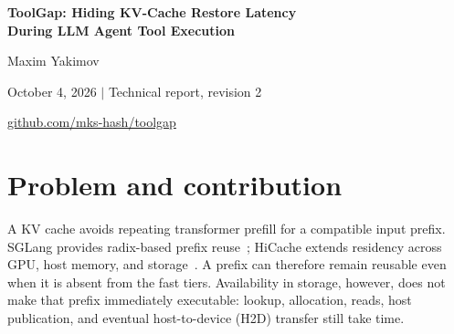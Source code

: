 \documentclass[10pt,a4paper]{article}
\newcommand{\repo}{\href{https://github.com/mks-hash/toolgap}{github.com/mks-hash/toolgap}}
\begin{document}
\thispagestyle{plain}
\begin{center}
{\LARGE\bfseries ToolGap: Hiding KV-Cache Restore Latency\\[4pt]During LLM Agent Tool Execution}\par
\vspace{7pt}
{\large Maxim Yakimov}\par
October 4, 2026 \quad $\vert$ \quad Technical report, revision 2\par
\repo
\end{center}
\vspace{2pt}
\begin{abstract}
Tool-using language-model applications contain intervals in which an external tool runs before the next generation request can be submitted. If a reusable key--value (KV) prefix has moved below resident GPU and host cache, restoring it only after that request arrives exposes storage latency on the continuation path. ToolGap is an experimental SGLang extension that accepts an exact-prefix control signal during tool execution, restores file-backed KV into resident host L2, and lets the later ordinary request reuse it through existing prefix matching and host-to-device transfer. It adds no proactive GPU transfer and reuses the existing cache controller's allocation, publication, and cleanup machinery.

Two controlled evaluations use one NVIDIA L4 and Qwen2.5-1.5B-Instruct. A 45-trial synthetic-gap experiment observes 67--71\% lower median continuation time to first token (TTFT) at 500--3000\,ms gaps. A separate 12-run model--document-search--continuation experiment observes median TTFT of 511.96\,ms versus 134.30\,ms when the reusable prefix is L3-only, and tool-dispatch-to-first-token latency of 1158.86\,ms versus 763.89\,ms. The GPU-resident negative control shows no meaningful TTFT improvement. Each condition has three repetitions. Cache-state probes, publication timestamps, consumed-cache counters, output-token equality, and cleanup accounting support the intended overlap mechanism. These observations establish a bounded capability, not statistical significance, production readiness, or a universal agent speedup.
\end{abstract}

\section{Problem and contribution}
A KV cache avoids repeating transformer prefill for a compatible input prefix. SGLang provides radix-based prefix reuse~\cite{sglang}; HiCache extends residency across GPU, host memory, and storage~\cite{hicache}. A prefix can therefore remain reusable even when it is absent from the fast tiers. Availability in storage, however, does not make that prefix immediately executable: lookup, allocation, reads, host publication, and eventual host-to-device (H2D) transfer still take time.
\end{document}
